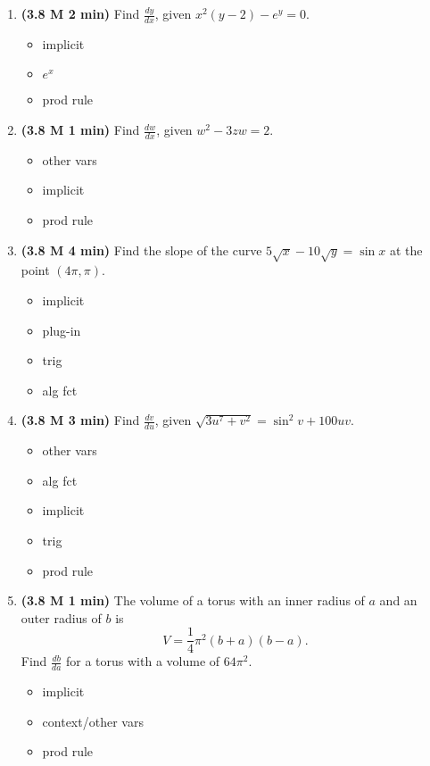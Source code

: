 \documentclass[12pt]{article}
\begin{document}
\begin{enumerate}[1.]
\newpage
\item {\bf (3.8 M 2 min)} Find $\frac{dy}{dx}$, given $x^2(y-2)-e^y=0$.
{\bf\begin{itemize}
\item implicit
\item $e^x$
\item prod rule
\end{itemize}}

\item {\bf (3.8 M 1 min)} Find $\frac{dw}{dx}$, given $w^2-3zw=2$.
{\bf\begin{itemize}
\item other vars
\item implicit
\item prod rule
\end{itemize}}

\item {\bf (3.8 M 4 min)} Find the slope of the curve $5\sqrt x-10\sqrt y=\sin x$ at the point $(4\pi,\pi)$.
{\bf\begin{itemize}
\item implicit
\item plug-in
\item trig
\item alg fct
\end{itemize}}
	
\item {\bf (3.8 M 3 min)} Find $\frac{dv}{du}$, given $\sqrt{3u^7+v^2}=\sin^2v+100uv$.
{\bf\begin{itemize}
\item other vars
\item alg fct
\item implicit
\item trig
\item prod rule
\end{itemize}}

\item {\bf (3.8 M 1 min)} The volume of a torus with an inner radius of $a$ and an outer radius of $b$ is 
\[
V=\textstyle\frac{1}{4}\pi^2(b+a)(b-a).
\]
Find $\frac{db}{da}$ for a torus with a volume of $64\pi^2$.
{\bf\begin{itemize}
\item implicit
\item context/other vars
\item prod rule
\end{itemize}}


\end{enumerate}
\end{document}
